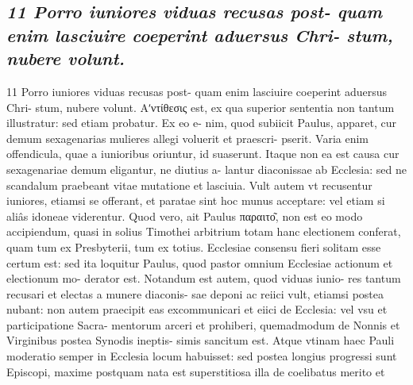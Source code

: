 \documentclass{article}
\begin{document}
\begin{pages}
\subsection*{\textit{11 Porro iuniores viduas recusas post- quam enim lasciuire coeperint aduersus Chri- stum, nubere volunt.}}11 Porro iuniores viduas recusas post- quam enim lasciuire coeperint aduersus Chri- stum, nubere volunt. Αʹντίθεσις est, ex qua superior sententia non tantum illustratur: sed etiam probatur. Ex eo e- nim, quod subiicit Paulus, apparet, cur demum sexagenarias mulieres allegi voluerit et praescri- pserit. Varia enim offendicula, quae a iunioribus oriuntur, id suaserunt. Itaque non ea est causa cur sexagenariae demum eligantur, ne diutius a- lantur diaconissae ab Ecclesia: sed ne scandalum praebeant vitae mutatione et lasciuia. Vult autem vt recusentur iuniores, etiamsi se offerant, et paratae sint hoc munus acceptare: vel etiam si aliâs idoneae viderentur. Quod vero, ait Paulus παραιτο͂, non est eo modo accipiendum, quasi in solius Timothei arbitrium totam hanc electionem conferat, quam tum ex Presbyterii, tum ex totius. Ecclesiae consensu fieri solitam esse certum est: sed ita loquitur Paulus, quod pastor omnium Ecclesiae actionum et electionum mo- derator est. Notandum est autem, quod viduas iunio- res tantum recusari et electas a munere diaconis- sae deponi ac reiici vult, etiamsi postea nubant: non autem praecipit eas excommunicari et eiici de Ecclesia: vel vsu et participatione Sacra- mentorum arceri et prohiberi, quemadmodum de Nonnis et Virginibus postea Synodis ineptis- simis sancitum est. Atque vtinam haec Pauli moderatio semper in Ecclesia locum habuisset: sed postea longius progressi sunt Episcopi, maxime postquam nata est superstitiosa illa de coelibatus merito et  \pend

\end{pages}
\end{document}
